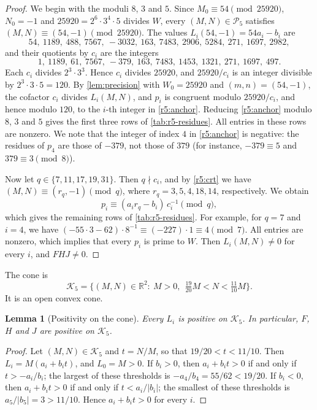 \documentclass[12pt,oneside,openany]{book}
\theoremstyle{definition}
\theoremstyle{plain}
\numberwithin{equation}{chapter}
\theoremstyle{plain}
\newtheorem{lemma}[lemma]{Lemma}
\theoremstyle{definition}
\theoremstyle{remark}
\newcommand{\R}{\mathbb R}
\newcommand{\cP}{\mathcal P}
\newcommand{\cK}{\mathcal K}
\begin{document}
\begin{proof}
We begin with the moduli $8$, $3$ and $5$. Since $M_0\equiv54\pmod{25920}$, $N_0=-1$ and $25920=2^6\cdot3^4\cdot5$ divides $W$, every $(M,N)\in\cP_5$ satisfies $(M,N)\equiv(54,-1)\pmod{25920}$. The values $L_i(54,-1)=54a_i-b_i$ are
\[
54,\ 1189,\ 488,\ 7567,\ -3032,\ 163,\ 7483,\ 2906,\ 5284,\ 271,\ 1697,\ 2982,
\]
and their quotients by $c_i$ are the integers
\begin{equation}\label{r5:anchor}
1,\ 1189,\ 61,\ 7567,\ -379,\ 163,\ 7483,\ 1453,\ 1321,\ 271,\ 1697,\ 497.
\end{equation}
Each $c_i$ divides $2^3\cdot3^3$. Hence $c_i$ divides $25920$, and $25920/c_i$ is an integer divisible by $2^3\cdot3\cdot5=120$. By \cref{lem:precision} with $W_0=25920$ and $(m,n)=(54,-1)$, the cofactor $c_i$ divides $L_i(M,N)$, and $p_i$ is congruent modulo $25920/c_i$, and hence modulo $120$, to the $i$-th integer in \eqref{r5:anchor}. Reducing \eqref{r5:anchor} modulo $8$, $3$ and $5$ gives the first three rows of \cref{tab:r5-residues}. All entries in these rows are nonzero. We note that the integer of index $4$ in \eqref{r5:anchor} is negative: the residues of $p_4$ are those of $-379$, not those of $379$ (for instance, $-379\equiv5$ and $379\equiv3\pmod8$).

Now let $q\in\{7,11,17,19,31\}$. Then $q\nmid c_i$, and by \eqref{r5:crt} we have $(M,N)\equiv(r_q,-1)\pmod q$, where $r_q=3,5,4,18,14$, respectively. We obtain
\[
p_i\equiv(a_ir_q-b_i)\,c_i^{-1}\pmod q,
\]
which gives the remaining rows of \cref{tab:r5-residues}. For example, for $q=7$ and $i=4$, we have $(-55\cdot3-62)\cdot8^{-1}\equiv(-227)\cdot1\equiv4\pmod7$. All entries are nonzero, which implies that every $p_i$ is prime to $W$. Then $L_i(M,N)\ne0$ for every $i$, and $FHJ\ne0$.
\end{proof}

The cone is
\begin{equation}\label{r5:cone}
\cK_5=\Big\{(M,N)\in\R^2:\ M>0,\ \ \tfrac{19}{20}M<N<\tfrac{11}{10}M\Big\}.
\end{equation}
It is an open convex cone.

\begin{lemma}[Positivity on the cone]\label{lem:r5-cone}
Every $L_i$ is positive on $\cK_5$. In particular, $F$, $H$ and $J$ are positive on $\cK_5$.
\end{lemma}

\begin{proof}
Let $(M,N)\in\cK_5$ and $t=N/M$, so that $19/20<t<11/10$. Then $L_i=M(a_i+b_it)$, and $L_0=M>0$. If $b_i>0$, then $a_i+b_it>0$ if and only if $t>-a_i/b_i$; the largest of these thresholds is $-a_4/b_4=55/62<19/20$. If $b_i<0$, then $a_i+b_it>0$ if and only if $t<a_i/|b_i|$; the smallest of these thresholds is $a_5/|b_5|=3>11/10$. Hence $a_i+b_it>0$ for every $i$.
\end{proof}
\end{document}
